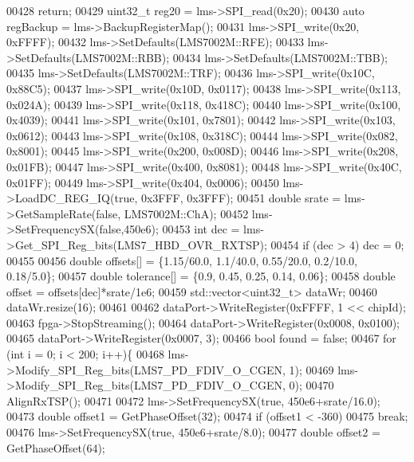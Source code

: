 \begin{DoxyCode}
00428         \textcolor{keywordflow}{return};
00429     uint32\_t reg20 = lms->SPI_read(0x20);
00430     \textcolor{keyword}{auto} regBackup = lms->BackupRegisterMap();
00431     lms->SPI_write(0x20, 0xFFFF);
00432     lms->SetDefaults(LMS7002M::RFE);
00433     lms->SetDefaults(LMS7002M::RBB);
00434     lms->SetDefaults(LMS7002M::TBB);
00435     lms->SetDefaults(LMS7002M::TRF);
00436     lms->SPI_write(0x10C, 0x88C5);
00437     lms->SPI_write(0x10D, 0x0117);
00438     lms->SPI_write(0x113, 0x024A);
00439     lms->SPI_write(0x118, 0x418C);
00440     lms->SPI_write(0x100, 0x4039);
00441     lms->SPI_write(0x101, 0x7801);
00442     lms->SPI_write(0x103, 0x0612);
00443     lms->SPI_write(0x108, 0x318C);
00444     lms->SPI_write(0x082, 0x8001);
00445     lms->SPI_write(0x200, 0x008D);
00446     lms->SPI_write(0x208, 0x01FB);
00447     lms->SPI_write(0x400, 0x8081);
00448     lms->SPI_write(0x40C, 0x01FF);
00449     lms->SPI_write(0x404, 0x0006);
00450     lms->LoadDC_REG_IQ(\textcolor{keyword}{true}, 0x3FFF, 0x3FFF);
00451     \textcolor{keywordtype}{double} srate = lms->GetSampleRate(\textcolor{keyword}{false}, LMS7002M::ChA);
00452     lms->SetFrequencySX(\textcolor{keyword}{false},450e6);
00453     \textcolor{keywordtype}{int} dec = lms->Get_SPI_Reg_bits(LMS7_HBD_OVR_RXTSP);
00454     \textcolor{keywordflow}{if} (dec > 4) dec = 0;
00455 
00456     \textcolor{keywordtype}{double} offsets[] = \{1.15/60.0, 1.1/40.0, 0.55/20.0, 0.2/10.0, 0.18/5.0\};
00457     \textcolor{keywordtype}{double} tolerance[] = \{0.9, 0.45, 0.25, 0.14, 0.06\};
00458     \textcolor{keywordtype}{double} offset = offsets[dec]*srate/1e6;
00459     std::vector<uint32\_t>  dataWr;
00460     dataWr.resize(16);
00461 
00462     dataPort->WriteRegister(0xFFFF, 1 << chipId);
00463     fpga->StopStreaming();
00464     dataPort->WriteRegister(0x0008, 0x0100);
00465     dataPort->WriteRegister(0x0007, 3);
00466     \textcolor{keywordtype}{bool} found = \textcolor{keyword}{false};
00467     \textcolor{keywordflow}{for} (\textcolor{keywordtype}{int} i = 0; i < 200; i++)\{
00468         lms->Modify_SPI_Reg_bits(LMS7_PD_FDIV_O_CGEN, 1);
00469         lms->Modify_SPI_Reg_bits(LMS7_PD_FDIV_O_CGEN, 0);
00470         AlignRxTSP();
00471 
00472         lms->SetFrequencySX(\textcolor{keyword}{true}, 450e6+srate/16.0);
00473         \textcolor{keywordtype}{double} offset1 = GetPhaseOffset(32);
00474         \textcolor{keywordflow}{if} (offset1 < -360)
00475             \textcolor{keywordflow}{break};
00476         lms->SetFrequencySX(\textcolor{keyword}{true}, 450e6+srate/8.0);
00477         \textcolor{keywordtype}{double} offset2 = GetPhaseOffset(64);

\end{DoxyCode}

